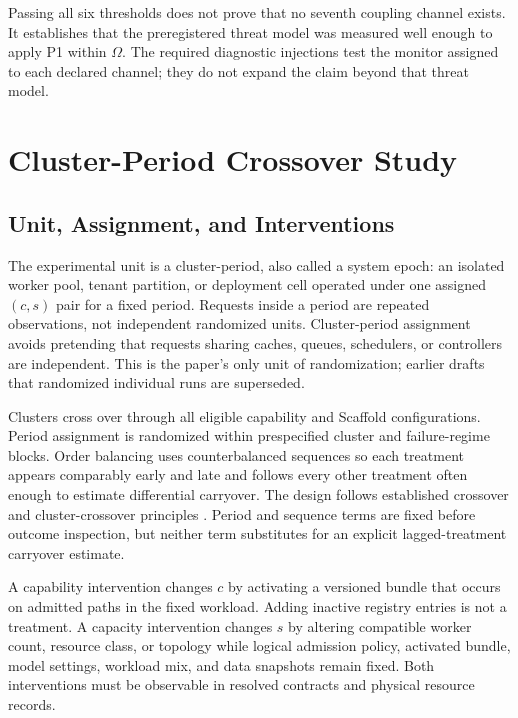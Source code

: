 Passing all six thresholds does not prove that no seventh coupling channel exists. It establishes that the preregistered threat model was measured well enough to apply P1 within $\Omega$. The required diagnostic injections test the monitor assigned to each declared channel; they do not expand the claim beyond that threat model.

\section{Cluster-Period Crossover Study}
\label{sec:evaluation}

\subsection{Unit, Assignment, and Interventions}

The experimental unit is a cluster-period, also called a system epoch: an isolated worker pool, tenant partition, or deployment cell operated under one assigned $(c,s)$ pair for a fixed period. Requests inside a period are repeated observations, not independent randomized units. Cluster-period assignment avoids pretending that requests sharing caches, queues, schedulers, or controllers are independent. This is the paper's only unit of randomization; earlier drafts that randomized individual runs are superseded.

Clusters cross over through all eligible capability and Scaffold configurations. Period assignment is randomized within prespecified cluster and failure-regime blocks. Order balancing uses counterbalanced sequences so each treatment appears comparably early and late and follows every other treatment often enough to estimate differential carryover. The design follows established crossover and cluster-crossover principles \cite{jones2014crossover,turner2007cluster}. Period and sequence terms are fixed before outcome inspection, but neither term substitutes for an explicit lagged-treatment carryover estimate.

A capability intervention changes $c$ by activating a versioned bundle that occurs on admitted paths in the fixed workload. Adding inactive registry entries is not a treatment. A capacity intervention changes $s$ by altering compatible worker count, resource class, or topology while logical admission policy, activated bundle, model settings, workload mix, and data snapshots remain fixed. Both interventions must be observable in resolved contracts and physical resource records.

